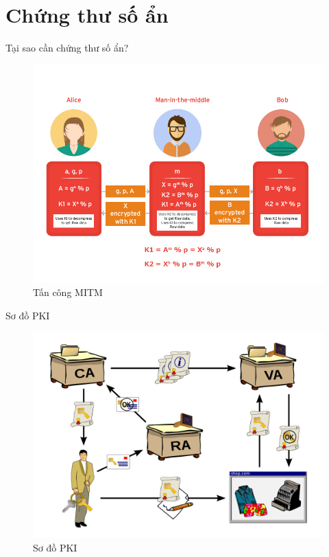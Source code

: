 \documentclass[compress]{beamer}
\begin{document}
\section{Chứng thư số ẩn}
\begin{frame}{Tại sao cần chứng thư số ẩn?}
\begin{center}
\begin{figure}
\includegraphics[width=0.8\linewidth]{../amit.jpg}
\caption*{Tấn công MITM}
\end{figure}
\end{center}
\end{frame}
\begin{frame}{Sơ đồ PKI}
\begin{center}
\begin{figure}
\centering
\includegraphics[width=0.8\linewidth]{../PKI.png}
\caption*{Sơ đồ PKI}
\end{figure}
\end{center}
\end{frame}
\end{document}
